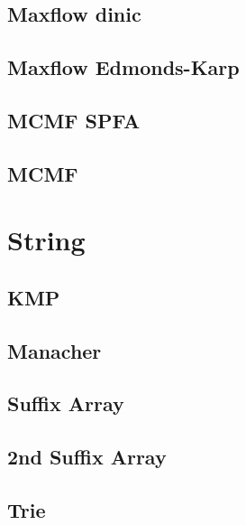 \documentclass[10pt,landscape,a4paper,twocolumn]{article}
\begin{document}
\subsection{Maxflow dinic}


\subsection{Maxflow Edmonds-Karp}


\subsection{MCMF SPFA}


\subsection{MCMF}



\section{String}
\subsection{KMP}


\subsection{Manacher}


\subsection{Suffix Array}


\subsection{2nd Suffix Array}


\subsection{Trie}

\end{document}
